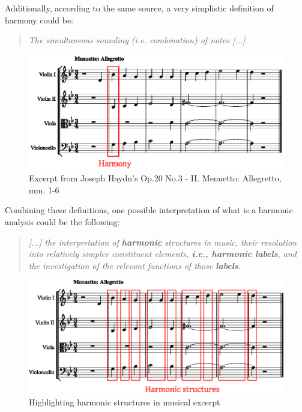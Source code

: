 Additionally, according to the same source, a very simplistic definition of harmony could be: \cite{oxfordharmony}

\begin{quote}
\centering
\emph{The simultaneous sounding (i.e. combination) of notes [...]}
\end{quote}

\begin{figure}[h]
  \centering
    \includegraphics[width=1.0\textwidth]{01-introduction/figures/1}
  \caption{Excerpt from Joseph Haydn's Op.20 No.3 - II. Menuetto: Allegretto, mm. 1-6}
  \label{fig:harmony}
\end{figure}

Combining these definitions, one possible interpretation of what is a harmonic analysis could be the following:

\begin{quote}
\centering
\emph{[...] the interpretation of \textbf{harmonic} structures in music,
their resolution into relatively simpler constituent elements, \textbf{i.e., harmonic labels}, and the investigation of the relevant functions of those \textbf{labels}.}
\end{quote}

\begin{figure}[h]
  \centering
    \includegraphics[width=1.0\textwidth]{01-introduction/figures/2}
  \caption{Highlighting harmonic structures in musical excerpt}
  \label{fig:harmonic-structures}
\end{figure}

